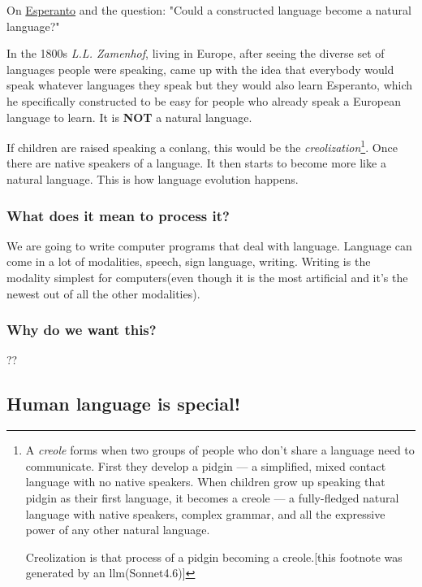 \documentclass[11pt]{article}
\begin{document}
\begin{tcolorbox}[colback=gray!10, colframe=gray!50, title=Note]
On \href{https://en.wikipedia.org/wiki/Esperanto}{Esperanto} and the question: "Could a constructed language become a natural language?"

In the 1800s \textit{L.L. Zamenhof}, living in Europe, after seeing the diverse set of languages people were speaking, came up with the idea that everybody would speak whatever languages they speak but they would also learn Esperanto, which he specifically constructed to be easy for people who already speak a European language to learn. It is \textbf{NOT} a natural language.


If children are raised speaking a conlang, this would be the \textit{creolization}\footnote{A \textit{creole} forms when two groups of people who don't share a language need to communicate. First they develop a pidgin — a simplified, mixed contact language with no native speakers. When children grow up speaking that pidgin as their first language, it becomes a creole — a fully-fledged natural language with native speakers, complex grammar, and all the expressive power of any other natural language.

Creolization is that process of a pidgin becoming a creole.[this footnote was generated by an llm(Sonnet4.6)]}.
Once there are native speakers of a language. It then starts to become more like a natural language. This is how language evolution happens. 

\end{tcolorbox}


\subsubsection{What does it mean to process it?}
We are going to write computer programs that deal with language. Language can come in a lot of modalities, speech, sign language, writing. Writing is the modality simplest for computers(even though it is the most artificial and it's the newest out of all the other modalities). 


\subsubsection{Why do we want this?}

??

\subsection*{Human language is special!}
\end{document}

